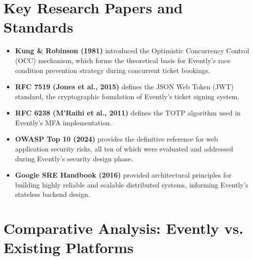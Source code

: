 \documentclass[12pt,a4paper]{report}
\begin{document}
\section{Key Research Papers and Standards}

\begin{itemize}[leftmargin=2em]
    \item \textbf{Kung \& Robinson (1981)} introduced the Optimistic Concurrency Control (OCC) mechanism, which forms the theoretical basis for Evently's race condition prevention strategy during concurrent ticket bookings.
    \item \textbf{RFC 7519 (Jones et al., 2015)} defines the JSON Web Token (JWT) standard, the cryptographic foundation of Evently's ticket signing system.
    \item \textbf{RFC 6238 (M'Raihi et al., 2011)} defines the TOTP algorithm used in Evently's MFA implementation.
    \item \textbf{OWASP Top 10 (2024)} provides the definitive reference for web application security risks, all ten of which were evaluated and addressed during Evently's security design phase.
    \item \textbf{Google SRE Handbook (2016)} provided architectural principles for building highly reliable and scalable distributed systems, informing Evently's stateless backend design.
\end{itemize}

\section{Comparative Analysis: Evently vs. Existing Platforms}
\end{document}
